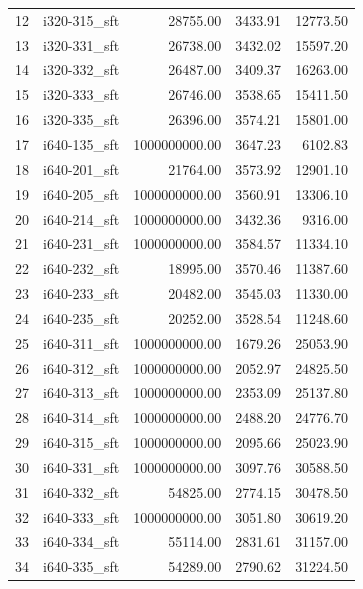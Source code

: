 \begin{tabular}{llrrr}
12 &  i320-315\_sft &      28755.00 &           3433.91 &    12773.50 \\
13 &  i320-331\_sft &      26738.00 &           3432.02 &    15597.20 \\
14 &  i320-332\_sft &      26487.00 &           3409.37 &    16263.00 \\
15 &  i320-333\_sft &      26746.00 &           3538.65 &    15411.50 \\
16 &  i320-335\_sft &      26396.00 &           3574.21 &    15801.00 \\
17 &  i640-135\_sft & 1000000000.00 &           3647.23 &     6102.83 \\
18 &  i640-201\_sft &      21764.00 &           3573.92 &    12901.10 \\
19 &  i640-205\_sft & 1000000000.00 &           3560.91 &    13306.10 \\
20 &  i640-214\_sft & 1000000000.00 &           3432.36 &     9316.00 \\
21 &  i640-231\_sft & 1000000000.00 &           3584.57 &    11334.10 \\
22 &  i640-232\_sft &      18995.00 &           3570.46 &    11387.60 \\
23 &  i640-233\_sft &      20482.00 &           3545.03 &    11330.00 \\
24 &  i640-235\_sft &      20252.00 &           3528.54 &    11248.60 \\
25 &  i640-311\_sft & 1000000000.00 &           1679.26 &    25053.90 \\
26 &  i640-312\_sft & 1000000000.00 &           2052.97 &    24825.50 \\
27 &  i640-313\_sft & 1000000000.00 &           2353.09 &    25137.80 \\
28 &  i640-314\_sft & 1000000000.00 &           2488.20 &    24776.70 \\
29 &  i640-315\_sft & 1000000000.00 &           2095.66 &    25023.90 \\
30 &  i640-331\_sft & 1000000000.00 &           3097.76 &    30588.50 \\
31 &  i640-332\_sft &      54825.00 &           2774.15 &    30478.50 \\
32 &  i640-333\_sft & 1000000000.00 &           3051.80 &    30619.20 \\
33 &  i640-334\_sft &      55114.00 &           2831.61 &    31157.00 \\
34 &  i640-335\_sft &      54289.00 &           2790.62 &    31224.50 \\
\bottomrule
\end{tabular}

